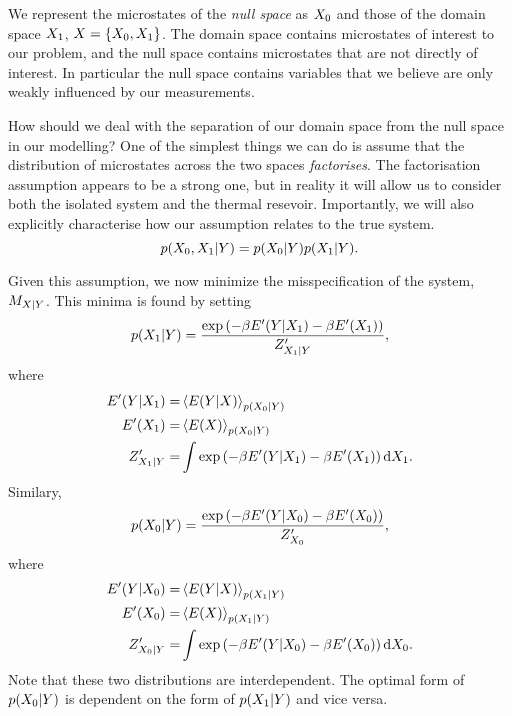 \documentclass[]{article}
\begin{document}
We represent the microstates of the \emph{null space} as
\(X_0\) and those of the domain space \(X_1\),
\(X = \{X_0, X_1\}\). The domain
space contains microstates of interest to our problem, and the null
space contains microstates that are not directly of interest. In
particular the null space contains variables that we believe are only
weakly influenced by our measurements.

How should we deal with the separation of our domain space from the null
space in our modelling? One of the simplest things we can do is assume
that the distribution of microstates across the two spaces
\emph{factorises}. The factorisation assumption appears to be a strong
one, but in reality it will allow us to consider both the isolated
system and the thermal resevoir. Importantly, we will also explicitly
characterise how our assumption relates to the true system. 
\[
p(X_0, X_1 | Y) = p(X_0|Y) p(X_1 | Y).
\]

Given this assumption, we now minimize the misspecification of the
system, \(M_{X|Y}\). This minima is found by
setting 
\[
p(X_1|Y) = \frac{\exp\left(-\beta E^\prime(Y |X_1) - \beta E^\prime(X_1)\right)}{Z^\prime_{X_1 | Y}}, 
\] 
where 
\begin{align*}
E^\prime(Y |X_1) = & \left\langle E(Y |X) \right\rangle_{p(X_0|Y)} \\
E^\prime(X_1) = & \left\langle E(X) \right\rangle_{p(X_0|Y)} \\
Z^\prime_{X_1 | Y} = & \int \exp\left(-\beta E^\prime(Y |X_1) - \beta E^\prime(X_1)\right) \text{d}X_1. 
\end{align*}
Similary, 
\[
p(X_0|Y) = \frac{\exp\left(-\beta E^\prime(Y |X_0) - \beta E^\prime(X_0)\right)}{Z^\prime_{X_0}},
\] 
where 
\begin{align*}
E^\prime(Y |X_0) = & \left\langle E(Y |X) \right\rangle_{p(X_1|Y)} \\
E^\prime(X_0) = & \left\langle E(X) \right\rangle_{p(X_1|Y)} \\
Z^\prime_{X_0 | Y} = & \int \exp\left(-\beta E^\prime(Y |X_0) - \beta E^\prime(X_0)\right) \text{d}X_0. 
\end{align*}
Note that these two distributions are interdependent. The optimal
form of \(p(X_0|Y)\) is dependent on
the form of \(p(X_1|Y)\) and vice
versa.
\end{document}
